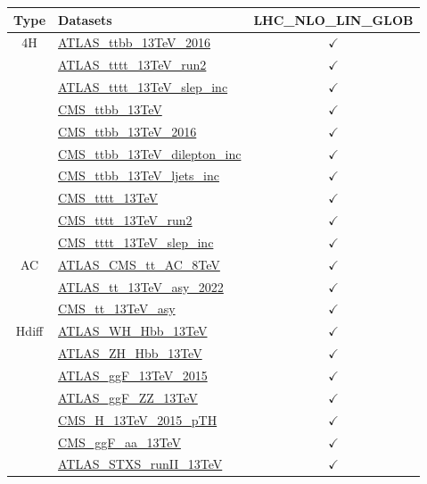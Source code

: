 \documentclass{article}
\begin{document}
\begin{longtable}{|c|l|c|}
\hline
\footnotesize
 Type & Datasets  & LHC_NLO_LIN_GLOB \\ \hline
\multirow{10}{*}{4H}
 & \href{https://arxiv.org}{ATLAS_ttbb_13TeV_2016}  & $\checkmark$\\ \cline{2-3}
 & \href{https://arxiv.org}{ATLAS_tttt_13TeV_run2}  & $\checkmark$\\ \cline{2-3}
 & \href{https://arxiv.org}{ATLAS_tttt_13TeV_slep_inc}  & $\checkmark$\\ \cline{2-3}
 & \href{https://arxiv.org}{CMS_ttbb_13TeV}  & $\checkmark$\\ \cline{2-3}
 & \href{https://arxiv.org}{CMS_ttbb_13TeV_2016}  & $\checkmark$\\ \cline{2-3}
 & \href{https://arxiv.org}{CMS_ttbb_13TeV_dilepton_inc}  & $\checkmark$\\ \cline{2-3}
 & \href{https://arxiv.org}{CMS_ttbb_13TeV_ljets_inc}  & $\checkmark$\\ \cline{2-3}
 & \href{https://arxiv.org}{CMS_tttt_13TeV}  & $\checkmark$\\ \cline{2-3}
 & \href{https://arxiv.org}{CMS_tttt_13TeV_run2}  & $\checkmark$\\ \cline{2-3}
 & \href{https://arxiv.org}{CMS_tttt_13TeV_slep_inc}  & $\checkmark$
\\ \hline
\multirow{3}{*}{AC}
 & \href{https://arxiv.org}{ATLAS_CMS_tt_AC_8TeV}  & $\checkmark$\\ \cline{2-3}
 & \href{https://arxiv.org}{ATLAS_tt_13TeV_asy_2022}  & $\checkmark$\\ \cline{2-3}
 & \href{https://arxiv.org}{CMS_tt_13TeV_asy}  & $\checkmark$
\\ \hline
\multirow{7}{*}{Hdiff}
 & \href{https://arxiv.org}{ATLAS_WH_Hbb_13TeV}  & $\checkmark$\\ \cline{2-3}
 & \href{https://arxiv.org}{ATLAS_ZH_Hbb_13TeV}  & $\checkmark$\\ \cline{2-3}
 & \href{https://arxiv.org}{ATLAS_ggF_13TeV_2015}  & $\checkmark$\\ \cline{2-3}
 & \href{https://arxiv.org}{ATLAS_ggF_ZZ_13TeV}  & $\checkmark$\\ \cline{2-3}
 & \href{https://arxiv.org}{CMS_H_13TeV_2015_pTH}  & $\checkmark$\\ \cline{2-3}
 & \href{https://arxiv.org}{CMS_ggF_aa_13TeV}  & $\checkmark$\\ \cline{2-3}
 & \href{https://arxiv.org}{ATLAS_STXS_runII_13TeV}  & $\checkmark$
\\ \hline

\end{longtable}
\end{document}
